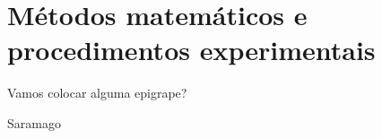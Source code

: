 
\chapter{Métodos matemáticos e procedimentos experimentais}

\epigraph{Vamos colocar alguma epigrape?}{Saramago}

%
%
%

%
%
%

